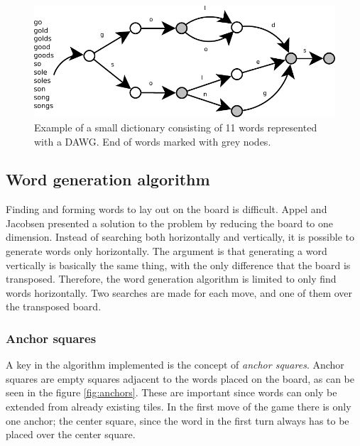 \documentclass[a4paper, 12pt]{report}
\begin{document}
\begin{figure}[h]
\centering
\includegraphics[scale=1]{dawg}
\caption{Example of a small dictionary consisting of 11 words represented with a DAWG. End of words marked with grey nodes.}
\label{fig:dawg}
\end{figure}

\subsection{Word generation algorithm}
Finding and forming words to lay out on the board is difficult. Appel and Jacobsen presented a solution to the problem by reducing the board to one dimension. Instead of searching both horizontally and vertically, it is possible to generate words only horizontally. The argument is that generating a word vertically is basically the same thing, with the only difference that the board is transposed. Therefore, the word generation algorithm is limited to only find words horizontally. Two searches are made for each move, and one of them over the transposed board. \cite{fastest}


\subsubsection{Anchor squares}
\label{sec:anchors}
A key in the algorithm implemented is the concept of \emph{anchor squares}. Anchor squares are empty squares adjacent to the words placed on the board, as can be seen in the figure \ref{fig:anchors}. These are important since words can only be extended from already existing tiles. In the first move of the game there is only one anchor; the center square, since the word in the first turn always has to be placed over the center square.
\end{document}

